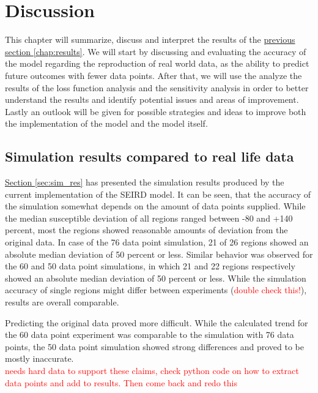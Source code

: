 
\chapter{Discussion} %
\label{chap:discussion} %

This chapter will summarize, discuss and interpret the results of the \hyperref[chap:results]{previous section
\ref*{chap:results}}. We will start by discussing and evaluating the accuracy of the model regarding the reproduction
of real world data, as the ability to predict future outcomes with fewer data points. After that, we will use the
analyze the results of the loss function analysis and the sensitivity analysis in order to better understand the results
and identify potential issues and areas of improvement. Lastly an outlook will be given for possible strategies and
ideas to improve both the implementation of the model and the model itself.

\section{Simulation results compared to real life data}
\hyperref[sec:sim_res]{Section \ref*{sec:sim_res}} has presented the simulation results produced by the current implementation
of the SEIRD model. It can be seen, that the accuracy of the simulation somewhat depends on the amount of data points supplied.
While the median susceptible deviation of all regions ranged between -80 and +140 percent, most the regions showed reasonable
amounts of deviation from the original data. In case of the 76 data point simulation, 21 of 26 regions showed an
absolute median deviation of 50 percent or less. Similar behavior was observed for the 60 and 50 data point simulations, in which
21 and 22 regions respectively showed an absolute median deviation of 50 percent or less. While the simulation accuracy of single regions
might differ between experiments (\textcolor{red}{double check this!}), results are overall comparable.\newline

Predicting the original data proved more difficult. While the calculated trend for the 60 data point experiment was comparable
to the simulation with 76 data points, the 50 data point simulation showed strong differences and proved to be mostly inaccurate.\\
\textcolor{red}{needs hard data to support these claims, check python code on how to extract data points and add to results.
Then come back and redo this}\\ %

